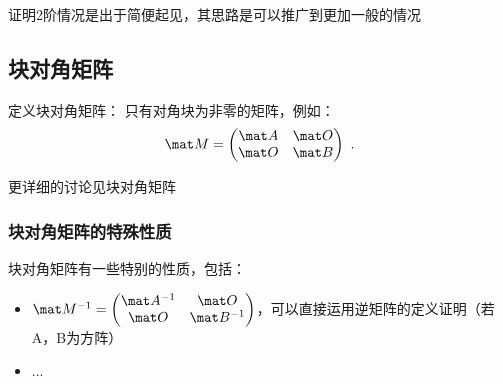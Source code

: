 证明2阶情况是出于简便起见，其思路是可以推广到更加一般的情况

\subsection{块对角矩阵}
定义块对角矩阵： 只有对角块为非零的矩阵，例如：
\begin{equation}
\mat M = 
\begin{pmatrix}
\mat A & \mat O\\
\mat O & \mat B\\
\end{pmatrix}~.
\end{equation}

更详细的讨论见块对角矩阵


\subsubsection{块对角矩阵的特殊性质}
块对角矩阵有一些特别的性质，包括：
\begin{itemize}
\item $\mat M ^ {-1} = 
\begin{pmatrix}
\mat A^{-1} & \mat O\\
\mat O & \mat B^{-1}\\
\end{pmatrix}
$，可以直接运用逆矩阵的定义证明（若A，B为方阵）
\item ...
\end{itemize}






